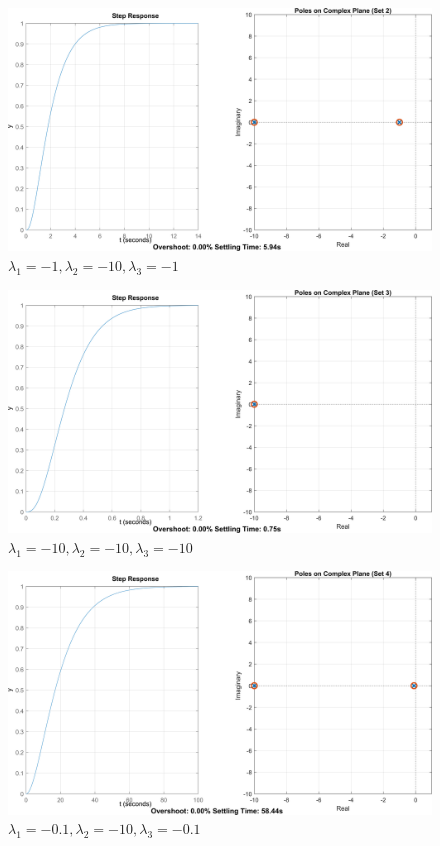 \begin{figure}[H]
    \centering
    \includegraphics[width=1\textwidth, trim={0cm 0cm 0cm 0cm}]{../images/4_2.png}
    \caption{$\lambda_1 = -1, \lambda_2 = -10, \lambda_3 = -1$}
\end{figure}

\begin{figure}[H]
    \centering
    \includegraphics[width=1\textwidth, trim={0cm 0cm 0cm 0cm}]{../images/4_3.png}
    \caption{$\lambda_1 = -10, \lambda_2 = -10, \lambda_3 = -10$}
\end{figure}

\begin{figure}[H]
    \centering
    \includegraphics[width=1\textwidth, trim={0cm 0cm 0cm 0cm}]{../images/4_4.png}
    \caption{$\lambda_1 = -0.1, \lambda_2 = -10, \lambda_3 = -0.1$}
\end{figure}

